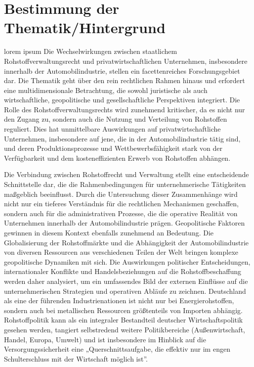 \documentclass[12pt,a4paper,oneside]{book} %
\begin{document}
	\section{Bestimmung der Thematik/Hintergrund}
	lorem ipsum
	Die Wechselwirkungen zwischen staatlichem Rohstoffverwaltungsrecht und privatwirtschaftlichen Unternehmen, insbesondere innerhalb der Automobilindustrie, stellen ein facettenreiches Forschungsgebiet dar. Die Thematik geht über den rein rechtlichen Rahmen hinaus und erfordert eine multidimensionale Betrachtung, die sowohl juristische als auch wirtschaftliche, geopolitische und gesellschaftliche Perspektiven integriert. Die Rolle des Rohstoffverwaltungsrechts wird zunehmend kritischer, da es nicht nur den Zugang zu, sondern auch die Nutzung und Verteilung von Rohstoffen reguliert. Dies hat unmittelbare Auswirkungen auf privatwirtschaftliche Unternehmen, insbesondere auf jene, die in der Automobilindustrie tätig sind, und deren Produktionsprozesse und Wettbewerbsfähigkeit stark von der Verfügbarkeit und dem kosteneffizienten Erwerb von Rohstoffen abhängen.
	
	Die Verbindung zwischen Rohstoffrecht und Verwaltung stellt eine entscheidende Schnittstelle dar, die die Rahmenbedingungen für unternehmerische Tätigkeiten maßgeblich beeinflusst. Durch die Untersuchung dieser Zusammenhänge wird nicht nur ein tieferes Verständnis für die rechtlichen Mechanismen geschaffen, sondern auch für die administrativen Prozesse, die die operative Realität von Unternehmen innerhalb der Automobilindustrie prägen. Geopolitische Faktoren gewinnen in diesem Kontext ebenfalls zunehmend an Bedeutung. Die Globalisierung der Rohstoffmärkte und die Abhängigkeit der Automobilindustrie von diversen Ressourcen aus verschiedenen Teilen der Welt bringen komplexe geopolitische Dynamiken mit sich. Die Auswirkungen politischer Entscheidungen, internationaler Konflikte und Handelsbeziehungen auf die Rohstoffbeschaffung werden daher analysiert, um ein umfassendes Bild der externen Einflüsse auf die unternehmerischen Strategien und operativen Abläufe zu zeichnen. Deutschland als eine der führenden Industrienationen ist nicht nur bei Energierohstoffen, sondern auch bei metallischen Ressourcen größtenteils von Importen abhängig. \autocite{dauke_rohstoff-_2011} Rohstoffpolitik kann als ein integraler Bestandteil deutscher Wirtschaftspolitik gesehen werden, tangiert selbstredend weitere Politikbereiche (Außenwirtschaft, Handel, Europa, Umwelt) und ist insbesondere im Hinblick auf die Versorgungssicherheit eine „Querschnittsaufgabe, die effektiv nur im engen Schulterschluss mit der Wirtschaft möglich ist”.\autocite{dauke_rohstoff-_2011}
	
\end{document}
